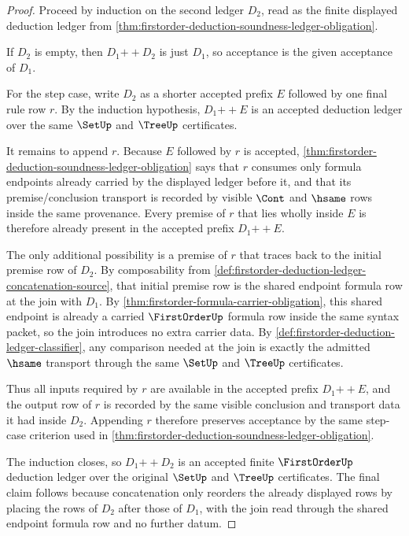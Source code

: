 \begin{proof}
Proceed by induction on the second ledger $D_2$, read as the finite displayed deduction ledger from \autoref{thm:firstorder-deduction-soundness-ledger-obligation}.

If $D_2$ is empty, then $D_1 \mathbin{+\!\!+} D_2$ is just $D_1$, so acceptance is the given acceptance of $D_1$.

For the step case, write $D_2$ as a shorter accepted prefix $E$ followed by one final rule row $r$. By the induction hypothesis, $D_1 \mathbin{+\!\!+} E$ is an accepted deduction ledger over the same $\SetUp$ and $\TreeUp$ certificates.

It remains to append $r$. Because $E$ followed by $r$ is accepted, \autoref{thm:firstorder-deduction-soundness-ledger-obligation} says that $r$ consumes only formula endpoints already carried by the displayed ledger before it, and that its premise/conclusion transport is recorded by visible $\Cont$ and $\hsame$ rows inside the same provenance. Every premise of $r$ that lies wholly inside $E$ is therefore already present in the accepted prefix $D_1 \mathbin{+\!\!+} E$.

The only additional possibility is a premise of $r$ that traces back to the initial premise row of $D_2$. By composability from \autoref{def:firstorder-deduction-ledger-concatenation-source}, that initial premise row is the shared endpoint formula row at the join with $D_1$. By \autoref{thm:firstorder-formula-carrier-obligation}, this shared endpoint is already a carried $\FirstOrderUp$ formula row inside the same syntax packet, so the join introduces no extra carrier data. By \autoref{def:firstorder-deduction-ledger-classifier}, any comparison needed at the join is exactly the admitted $\hsame$ transport through the same $\SetUp$ and $\TreeUp$ certificates.

Thus all inputs required by $r$ are available in the accepted prefix $D_1 \mathbin{+\!\!+} E$, and the output row of $r$ is recorded by the same visible conclusion and transport data it had inside $D_2$. Appending $r$ therefore preserves acceptance by the same step-case criterion used in \autoref{thm:firstorder-deduction-soundness-ledger-obligation}.

The induction closes, so $D_1 \mathbin{+\!\!+} D_2$ is an accepted finite $\FirstOrderUp$ deduction ledger over the original $\SetUp$ and $\TreeUp$ certificates. The final claim follows because concatenation only reorders the already displayed rows by placing the rows of $D_2$ after those of $D_1$, with the join read through the shared endpoint formula row and no further datum.
\end{proof}

